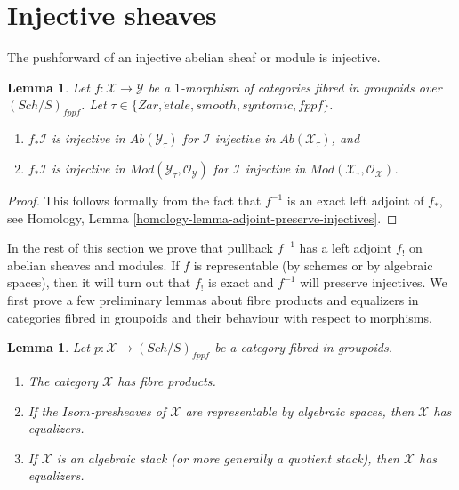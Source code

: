 \documentclass{stacks-project}
\theoremstyle{plain}
\newtheorem{lemma}[subsection]{Lemma}
\theoremstyle{definition}
\theoremstyle{remark}
\numberwithin{equation}{subsection}
\def\Sch{\mathit{Sch}}
\def\etale{{\acute{e}tale}}
\begin{document}
\section{Injective sheaves}
\label{section-lower-shriek}

\noindent
The pushforward of an injective abelian sheaf or module is injective.

\begin{lemma}
\label{lemma-pushforward-injective}
Let $f : \mathcal{X} \to \mathcal{Y}$ be a $1$-morphism of categories
fibred in groupoids over $(\Sch/S)_{fppf}$. Let
$\tau \in \{Zar, \etale, smooth, syntomic, fppf\}$.
\begin{enumerate}
\item $f_*\mathcal{I}$ is injective in $\textit{Ab}(\mathcal{Y}_\tau)$
for $\mathcal{I}$ injective in $\textit{Ab}(\mathcal{X}_\tau)$, and
\item $f_*\mathcal{I}$ is injective in
$\textit{Mod}(\mathcal{Y}_\tau, \mathcal{O}_\mathcal{Y})$
for $\mathcal{I}$ injective in
$\textit{Mod}(\mathcal{X}_\tau, \mathcal{O}_\mathcal{X})$.
\end{enumerate}
\end{lemma}

\begin{proof}
This follows formally from the fact that $f^{-1}$ is an exact
left adjoint of $f_*$, see
Homology, Lemma \ref{homology-lemma-adjoint-preserve-injectives}.
\end{proof}

\noindent
In the rest of this section we prove that pullback $f^{-1}$ has a left
adjoint $f_!$ on abelian sheaves and modules. If $f$ is representable (by
schemes or by algebraic spaces), then it will turn out that $f_!$ is exact
and $f^{-1}$ will preserve injectives. We first prove a few
preliminary lemmas about fibre products and equalizers in categories
fibred in groupoids and their behaviour with respect to morphisms.

\begin{lemma}
\label{lemma-fibre-products}
Let $p : \mathcal{X} \to (\Sch/S)_{fppf}$
be a category fibred in groupoids.
\begin{enumerate}
\item The category $\mathcal{X}$ has fibre products.
\item If the $\mathit{Isom}$-presheaves of $\mathcal{X}$
are representable by algebraic spaces, then $\mathcal{X}$ has equalizers.
\item If $\mathcal{X}$ is an algebraic stack (or more generally
a quotient stack), then $\mathcal{X}$ has equalizers.
\end{enumerate}
\end{lemma}
\end{document}
